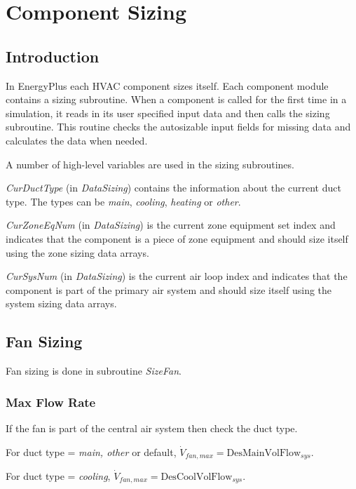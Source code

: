 \section{Component Sizing}\label{component-sizing}

\subsection{Introduction}\label{introduction}

In EnergyPlus each HVAC component sizes itself. Each component module contains a sizing subroutine. When a component is called for the first time in a simulation, it reads in its user specified input data and then calls the sizing subroutine. This routine checks the autosizable input fields for missing data and calculates the data when needed.

A number of high-level variables are used in the sizing subroutines.

\emph{CurDuctType} (in \emph{DataSizing}) contains the information about the current duct type. The types can be \emph{main}, \emph{cooling}, \emph{heating} or \emph{other}.

\emph{CurZoneEqNum} (in \emph{DataSizing}) is the current zone equipment set index and indicates that the component is a piece of zone equipment and should size itself using the zone sizing data arrays.

\emph{CurSysNum} (in \emph{DataSizing}) is the current air loop index and indicates that the component is part of the primary air system and should size itself using the system sizing data arrays.

\subsection{Fan Sizing}\label{fan-sizing}

Fan sizing is done in subroutine \emph{SizeFan}.

\subsubsection{Max Flow Rate}\label{max-flow-rate}

If the fan is part of the central air system then check the duct type.

For duct type = \emph{main, other} or default, \(\dot{V}_{fan,max} = \text{DesMainVolFlow}_{sys}\).

For duct type = \emph{cooling}, \(\dot{V}_{fan,max} = \text{DesCoolVolFlow}_{sys}\).

